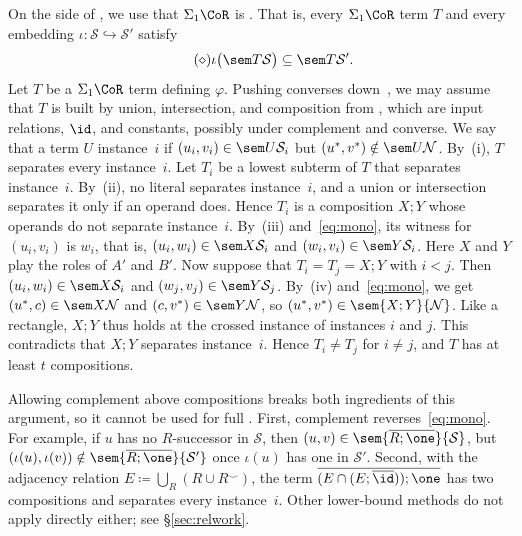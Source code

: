 On the side of \CoR, we use that $\Sigma_1\CoR$ is . That is, every $\Sigma_1\CoR$ term $T$ and every embedding
$\iota\colon\mathcal S\hookrightarrow\mathcal S'$ satisfy
\begin{equation*}\tag{$\diamond$}\label{eq:mono}
 \iota\bigl(\sem T{\mathcal S}\bigr)\subseteq\sem T{\mathcal S'}.
\end{equation*}
Let $T$ be a $\Sigma_1\CoR$ term defining $\varphi$. Pushing converses
down~\citep[Proposition~6.2]{nakamura2022}, we may assume that $T$ is
built by union, intersection, and composition from , which
are input relations, $\id$, and constants, possibly under complement and
converse. We say that a term $U$  instance~$i$ if
$(u_i,v_i)\in\sem U{\mathcal S_i}$ but $(u^*,v^*)\notin\sem U{\mathcal N}$.
By~(i), $T$ separates every instance~$i$. Let $T_i$ be a lowest subterm of
$T$ that separates instance~$i$. By~(ii), no literal separates instance~$i$,
and a union or intersection separates it only if an operand does. Hence
$T_i$ is a composition $X;Y$ whose operands do not separate instance~$i$.
By~(iii) and~\eqref{eq:mono}, its witness for $(u_i,v_i)$ is $w_i$, that
is, $(u_i,w_i)\in\sem X{\mathcal S_i}$ and
$(w_i,v_i)\in\sem Y{\mathcal S_i}$. Here $X$ and $Y$ play the roles of
$A'$ and $B'$. Now suppose that $T_i=T_j=X;Y$ with $i<j$. Then
$(u_i,w_i)\in\sem X{\mathcal S_i}$ and $(w_j,v_j)\in\sem Y{\mathcal S_j}$.
By~(iv) and~\eqref{eq:mono}, we get $(u^*,c)\in\sem X{\mathcal N}$ and
$(c,v^*)\in\sem Y{\mathcal N}$, so $(u^*,v^*)\in\sem{X;Y}{\mathcal N}$.
Like a rectangle, $X;Y$ thus holds at the crossed instance of instances $i$
and $j$. This contradicts that $X;Y$ separates instance~$i$. Hence
$T_i\ne T_j$ for $i\ne j$, and $T$ has at least $t$ compositions.

Allowing complement above compositions breaks both ingredients of this
argument, so it cannot be used for full \CoR. First, complement
reverses~\eqref{eq:mono}. For example, if $u$ has no $R$-successor in
$\mathcal S$, then $(u,v)\in\sem{\overline{R;\one}}{\mathcal S}$, but
$(\iota(u),\iota(v))\notin\sem{\overline{R;\one}}{\mathcal S'}$ once
$\iota(u)$ has one in $\mathcal S'$. Second, with the adjacency relation
$E\coloneqq\bigcup_R(R\cup R^\smile)$, the term
$\overline{(E\cap(E;\overline{\id}));\one}$ has two compositions and
separates every instance~$i$. Other lower-bound methods do not apply
directly either; see \S\ref{sec:relwork}.
